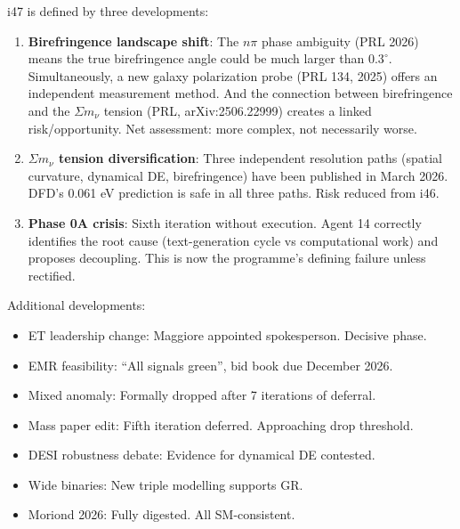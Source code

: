 \documentclass[11pt,a4paper]{article}
\begin{document}
\begin{tcolorbox}[colback=yellow!5!white, colframe=yellow!60!black,
  title={i47: Birefringence Landscape Shifts, $\Sigma m_\nu$ Risk Reduces, Phase 0A Crisis Deepens}]

i47 is defined by three developments:

\begin{enumerate}
\item \textbf{Birefringence landscape shift}: The $n\pi$ phase ambiguity (PRL 2026) means the true birefringence angle could be much larger than $0.3^\circ$. Simultaneously, a new galaxy polarization probe (PRL 134, 2025) offers an independent measurement method. And the connection between birefringence and the $\Sigma m_\nu$ tension (PRL, arXiv:2506.22999) creates a linked risk/opportunity. Net assessment: more complex, not necessarily worse.

\item \textbf{$\Sigma m_\nu$ tension diversification}: Three independent resolution paths (spatial curvature, dynamical DE, birefringence) have been published in March 2026. DFD's 0.061 eV prediction is safe in all three paths. Risk reduced from i46.

\item \textbf{Phase 0A crisis}: Sixth iteration without execution. Agent 14 correctly identifies the root cause (text-generation cycle vs computational work) and proposes decoupling. This is now the programme's defining failure unless rectified.
\end{enumerate}

Additional developments:
\begin{itemize}
\item ET leadership change: Maggiore appointed spokesperson. Decisive phase.
\item EMR feasibility: ``All signals green'', bid book due December 2026.
\item Mixed anomaly: Formally dropped after 7 iterations of deferral.
\item Mass paper edit: Fifth iteration deferred. Approaching drop threshold.
\item DESI robustness debate: Evidence for dynamical DE contested.
\item Wide binaries: New triple modelling supports GR.
\item Moriond 2026: Fully digested. All SM-consistent.
\end{itemize}
\end{tcolorbox}
\end{document}

